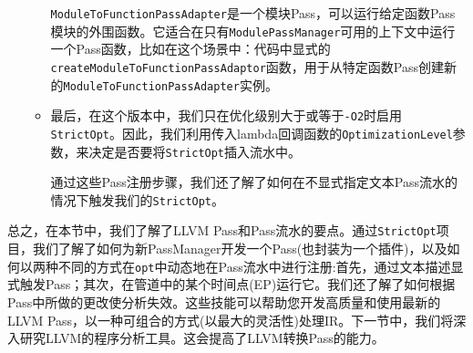 \begin{enumerate}
\begin{itemize}
\texttt{ModuleToFunctionPassAdapter}是一个模块Pass，可以运行给定函数Pass模块的外围函数。它适合在只有\texttt{ModulePassManager}可用的上下文中运行一个Pass函数，比如在这个场景中：代码中显式的\texttt{createModuleToFunctionPassAdaptor}函数，用于从特定函数Pass创建新的\texttt{ModuleToFunctionPassAdapter}实例。

\item 最后，在这个版本中，我们只在优化级别大于或等于\texttt{-O2}时启用\texttt{StrictOpt}。因此，我们利用传入lambda回调函数的\texttt{OptimizationLevel}参数，来决定是否要将\texttt{StrictOpt}插入流水中。

通过这些Pass注册步骤，我们还了解了如何在不显式指定文本Pass流水的情况下触发我们的\texttt{StrictOpt}。
\end{itemize}

\end{enumerate}

总之，在本节中，我们了解了LLVM Pass和Pass流水的要点。通过\texttt{StrictOpt}项目，我们了解了如何为新PassManager开发一个Pass(也封装为一个插件)，以及如何以两种不同的方式在\texttt{opt}中动态地在Pass流水中进行注册:首先，通过文本描述显式触发Pass；其次，在管道中的某个时间点(EP)运行它。我们还了解了如何根据Pass中所做的更改使分析失效。这些技能可以帮助您开发高质量和使用最新的LLVM Pass，以一种可组合的方式(以最大的灵活性)处理IR。下一节中，我们将深入研究LLVM的程序分析工具。这会提高了LLVM转换Pass的能力。
































